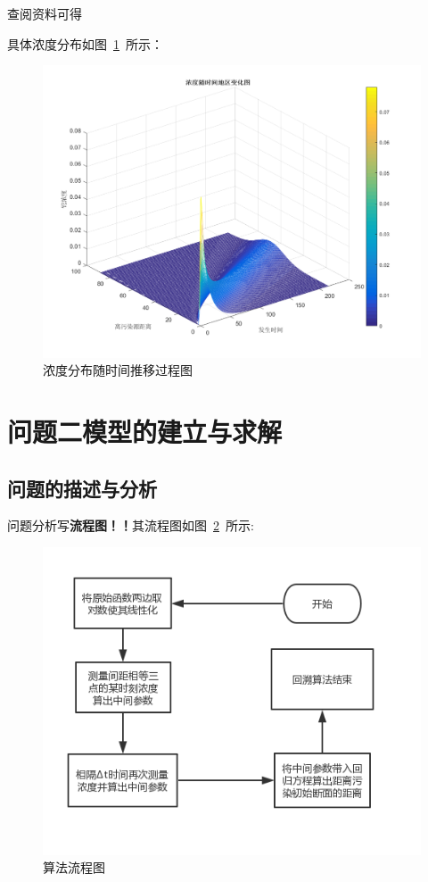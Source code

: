 \documentclass{whutmod}
\begin{document}
	查阅资料可得\parencite{geng2019novel}
	
具体浓度分布如图~\ref{llllll}~所示：

	\begin{figure}[H]
		\centering
		\includegraphics[width=\textwidth]{figures/matlab.png}
		\caption{浓度分布随时间推移过程图}\label{llllll}
	\end{figure}

	\section{问题二模型的建立与求解}
	\subsection{问题的描述与分析}
	问题分析写\textbf{流程图！！}其流程图如图~\ref{lct}~所示:
			\begin{figure}[H]
	\centering
	\includegraphics[width=.8\textwidth]{figures/lct.png}
	\caption{算法流程图}\label{lct}
	\end{figure}
\end{document}
